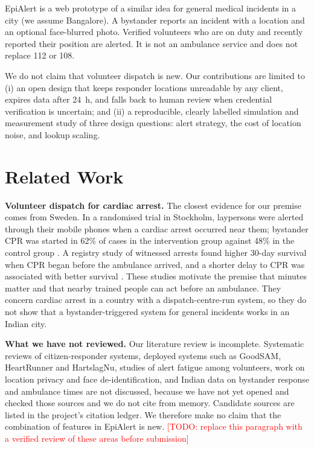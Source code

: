 \documentclass[conference]{IEEEtran}
\newcommand{\todo}[1]{\textcolor{red}{[TODO: #1]}}
\begin{document}
EpiAlert is a web prototype of a similar idea for general medical incidents in a city (we assume Bangalore). A bystander reports an incident with a location and an optional face-blurred photo. Verified volunteers who are on duty and recently reported their position are alerted. It is not an ambulance service and does not replace 112 or 108.

We do not claim that volunteer dispatch is new. Our contributions are limited to (i) an open design that keeps responder locations unreadable by any client, expires data after 24~h, and falls back to human review when credential verification is uncertain; and (ii) a reproducible, clearly labelled simulation and measurement study of three design questions: alert strategy, the cost of location noise, and lookup scaling.

\section{Related Work}
\textbf{Volunteer dispatch for cardiac arrest.} The closest evidence for our premise comes from Sweden. In a randomised trial in Stockholm, laypersons were alerted through their mobile phones when a cardiac arrest occurred near them; bystander CPR was started in 62\% of cases in the intervention group against 48\% in the control group \cite{ringh2015mobile}. A registry study of witnessed arrests found higher 30-day survival when CPR began before the ambulance arrived, and a shorter delay to CPR was associated with better survival \cite{hasselqvist2015early}. These studies motivate the premise that minutes matter and that nearby trained people can act before an ambulance. They concern cardiac arrest in a country with a dispatch-centre-run system, so they do not show that a bystander-triggered system for general incidents works in an Indian city.

\textbf{What we have not reviewed.} Our literature review is incomplete. Systematic reviews of citizen-responder systems, deployed systems such as GoodSAM, HeartRunner and HartslagNu, studies of alert fatigue among volunteers, work on location privacy and face de-identification, and Indian data on bystander response and ambulance times are not discussed, because we have not yet opened and checked those sources and we do not cite from memory. Candidate sources are listed in the project's citation ledger. We therefore make no claim that the combination of features in EpiAlert is new. \todo{replace this paragraph with a verified review of these areas before submission}
\end{document}
